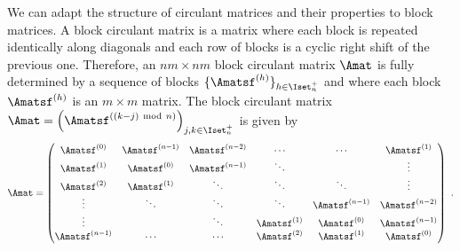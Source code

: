 We can adapt the structure of circulant matrices and their properties to block matrices. A block circulant matrix is a matrix where each block is repeated identically along diagonals and each row of blocks is a cyclic right shift of the previous one.
Therefore, an $nm \times nm$ block circulant matrix $\Amat$ is fully determined by a sequence of blocks $\{\Amatsf^{(h)}\}_{h \in \Iset^+_n}$ and where each block $\Amatsf^{(h)}$ is an $m \times m$ matrix.
The block circulant matrix $\Amat = \leftmat \Amatsf^{((k-j) \mod n)} \rightmat_{j,k \in \Iset^+_n} $ is given by
\begin{equation}
  \Amat = 
  \leftmatrix
    \Amatsf^{(0)}   & \Amatsf^{(n-1)} & \Amatsf^{(n-2)} & \cdots        & \cdots          & \Amatsf^{(1)}   \\
    \Amatsf^{(1)}   & \Amatsf^{(0)}   & \Amatsf^{(n-1)} & \ddots        &                 & \vdots        \\
    \Amatsf^{(2)}   & \Amatsf^{(1)}   & \ddots          & \ddots        & \ddots          & \vdots        \\ 
    \vdots          & \ddots          & \ddots          & \ddots        & \Amatsf^{(n-1)} & \Amatsf^{(n-2)} \\
    \vdots          &                 & \ddots          & \Amatsf^{(1)} & \Amatsf^{(0)}   & \Amatsf^{(n-1)} \\
    \Amatsf^{(n-1)} & \cdots          & \cdots          & \Amatsf^{(2)} & \Amatsf^{(1)}   & \Amatsf^{(0)}
  \rightmatrix \enspace.
\end{equation}

